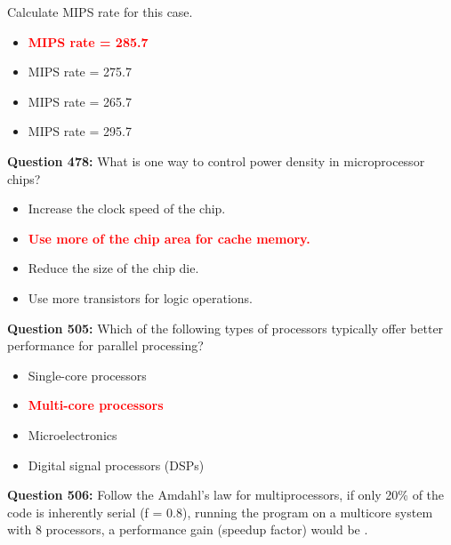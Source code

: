 \documentclass[12pt,a4paper]{article}
\begin{document}
Calculate MIPS rate for this case.

\begin{itemize}
    \item[\textbf{A.}] \textcolor{red}{\textbf{MIPS rate = 285.7}}
    \item[\textbf{B.}] MIPS rate = 275.7
    \item[\textbf{C.}] MIPS rate = 265.7
    \item[\textbf{D.}] MIPS rate = 295.7
\end{itemize}

\vspace{0.5cm}

\textbf{Question 478:} What is one way to control power density in microprocessor chips?

\begin{itemize}
    \item[\textbf{A.}] Increase the clock speed of the chip.
    \item[\textbf{B.}] \textcolor{red}{\textbf{Use more of the chip area for cache memory.}}
    \item[\textbf{C.}] Reduce the size of the chip die.
    \item[\textbf{D.}] Use more transistors for logic operations.
\end{itemize}

\vspace{0.5cm}

\vspace{0.5cm}

\textbf{Question 505:} Which of the following types of processors typically offer better performance for parallel processing?

\begin{itemize}
    \item[\textbf{A.}] Single-core processors
    \item[\textbf{B.}] \textcolor{red}{\textbf{Multi-core processors}}
    \item[\textbf{C.}] Microelectronics
    \item[\textbf{D.}] Digital signal processors (DSPs)
\end{itemize}

\vspace{0.5cm}

\vspace{0.5cm}

\textbf{Question 506:} Follow the Amdahl's law for multiprocessors, if only 20\% of the code is inherently serial (f = 0.8), running the program on a multicore system with 8 processors, a performance gain (speedup factor) would be \underline{\hspace{1.5cm}}.
\end{document}
